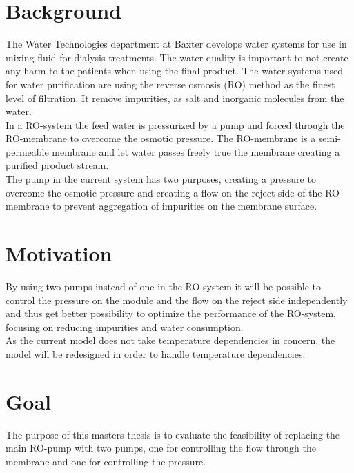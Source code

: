 
\section*{Background}

The Water Technologies department at Baxter develops water systems for use in mixing fluid for dialysis treatments. The water quality is important to not create any harm to the patients when using the final product. The water systems used for water purification are using the reverse osmosis (RO) method as the finest level of filtration. It remove impurities, as salt and inorganic molecules from the water\cite{Dow}.\\

In a RO-system the feed water is pressurized by a pump and forced through the RO-membrane to overcome the osmotic pressure. The RO-membrane is a semi-permeable membrane and let water passes freely true the membrane creating a purified product stream. \\

The pump in the current system has two purposes, creating a pressure to overcome the osmotic pressure and creating a flow on the reject side of the RO-membrane to prevent aggregation of impurities on the membrane surface.\\



\section*{Motivation}
By using two pumps instead of one in the RO-system it will be possible to control the pressure on the module and the flow on the reject side independently and thus get better possibility to optimize the performance of the RO-system, focusing on reducing impurities and water consumption. \\

As the current model does not take temperature dependencies in concern, the model will be redesigned in order to handle temperature dependencies.  

\section*{Goal}
The purpose of this masters thesis is to evaluate the feasibility of replacing the main RO-pump with two pumps, one for controlling the flow through the membrane and one for controlling the pressure. \\

